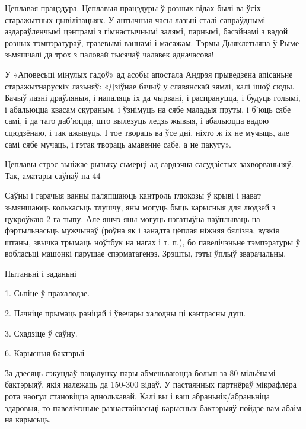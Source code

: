 Цеплавая працэдура. Цеплавыя працэдуры ў розных відах былі ва ўсіх старажытных цывілізацыях. У антычныя часы лазьні сталі сапраўднымі аздараўленчымі цэнтрамі з гімнастычнымі залямі, парнымі, басэйнамі з вадой розных тэмпэратураў, гразевымі ваннамі і масажам. Тэрмы Дыяклетыяна ў Рыме зьмяшчалі да трох з паловай тысячаў чалавек адначасова!

У «Аповесьці мінулых гадоў» ад асобы апостала Андрэя прыведзена апісаньне старажытнарускіх лазьняў: «Дзіўнае бачыў у славянскай зямлі, калі ішоў сюды. Бачыў лазні драўляныя, і напаляць іх да чырвані, і распрануцца, і будуць голымі, і абальюцца квасам скураным, і ўзнімуць на сябе маладыя пруты, і б’юць сябе самі, і да таго даб’юцца, што вылезуць ледзь жывыя, і абальюцца вадою сцюдзёнаю, і так ажывуць. І тое твораць ва ўсе дні, ніхто ж іх не мучыць, але самі сябе мучаць, і гэтак твораць амавенне сабе, а не пакуту».

Цеплавы стрэс зьніжае рызыку сьмерці ад сардэчна-сасудзістых захворваньняў. Так, аматары саўнаў на 44%

Саўны і гарачыя ванны паляпшаюць кантроль глюкозы ў крыві і нават зьмяншаюць колькасьць тлушчу, яны могуць быць карысныя для людзей з цукроўкаю 2-га тыпу. Але яшчэ яны могуць нэгатыўна паўплываць на фэртыльнасьць мужчынаў (роўна як і занадта цёплая ніжняя бялізна, вузкія штаны, звычка трымаць ноўтбук на нагах і т. п.), бо павелічэньне тэмпэратуры ў вобласьці машонкі парушае спэрматагенэз. Зрэшты, гэты ўплыў зварачальны.

Пытаньні і заданьні

1. Сьпіце ў прахалодзе.

2. Пачніце прымаць раніцай і ўвечары халодны ці кантрасны душ.

3. Схадзіце ў саўну.


6. Карысныя бактэрыі

За дзесяць сэкундаў пацалунку пары абменьваюцца больш за 80 мільёнамі бактэрыяў, якія належаць да 150-300 відаў. У пастаянных партнёраў мікрафлёра рота наогул становіцца аднолькавай. Калі вы і ваш абраньнік/абраньніца здаровыя, то павелічэньне разнастайнасьці карысных бактэрыяў пойдзе вам абаім на карысьць.

